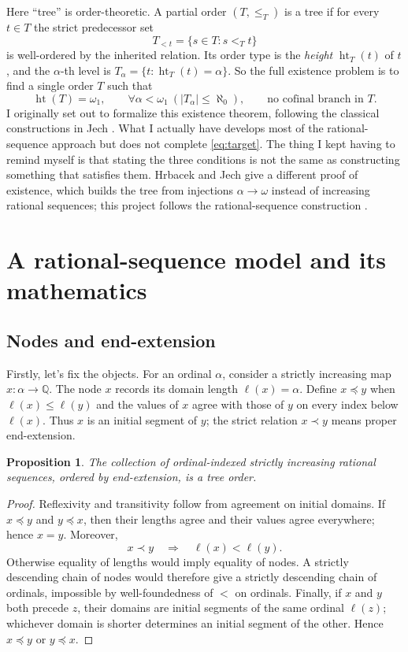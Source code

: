 \documentclass[10pt,letterpaper]{article}
\newtheorem{proposition}{Proposition}
\newcommand{\wone}{\omega_1}
\newcommand{\Q}{\mathbb{Q}}
\begin{document}
Here ``tree'' is order-theoretic. A partial order $(T,\leq_T)$ is a tree if for every $t\in T$ the strict predecessor set
\[
T_{<t}=\{s\in T:s<_Tt\}
\]
is well-ordered by the inherited relation. Its order type is the \emph{height} $\operatorname{ht}_T(t)$ of $t$, and the $\alpha$-th level is $T_\alpha=\{t:\operatorname{ht}_T(t)=\alpha\}$. So the full existence problem is to find a single order $T$ such that
\begin{equation}\label{eq:target}
\operatorname{ht}(T)=\wone,\qquad
\forall\alpha<\wone\ (|T_\alpha|\leq\aleph_0),\qquad
\text{no cofinal branch in }T.
\end{equation}
I originally set out to formalize this existence theorem, following the classical constructions in Jech \cite{jech}. What I actually have develops most of the rational-sequence approach but does not complete \eqref{eq:target}. The thing I kept having to remind myself is that stating the three conditions is not the same as constructing something that satisfies them. Hrbacek and Jech \cite[Ch.~12, Thm.~3.5]{hj} give a different proof of existence, which builds the tree from injections $\alpha\to\omega$ instead of increasing rational sequences; this project follows the rational-sequence construction \cite[Theorem 9.16]{jech}.


\section{A rational-sequence model and its mathematics}
\subsection{Nodes and end-extension}
Firstly, let's fix the objects. For an ordinal $\alpha$, consider a strictly increasing map $x:\alpha\to\Q$. The node $x$ records its domain length $\ell(x)=\alpha$. Define $x\preceq y$ when $\ell(x)\leq\ell(y)$ and the values of $x$ agree with those of $y$ on every index below $\ell(x)$. Thus $x$ is an initial segment of $y$; the strict relation $x\prec y$ means proper end-extension.

\begin{proposition}\label{prop:tree}
The collection of ordinal-indexed strictly increasing rational sequences, ordered by end-extension, is a tree order.
\end{proposition}
\begin{proof}
Reflexivity and transitivity follow from agreement on initial domains. If $x\preceq y$ and $y\preceq x$, then their lengths agree and their values agree everywhere; hence $x=y$. Moreover,
\[
x\prec y \quad\Longrightarrow\quad \ell(x)<\ell(y).
\]
Otherwise equality of lengths would imply equality of nodes. A strictly descending chain of nodes would therefore give a strictly descending chain of ordinals, impossible by well-foundedness of $<$ on ordinals. Finally, if $x$ and $y$ both precede $z$, their domains are initial segments of the same ordinal $\ell(z)$; whichever domain is shorter determines an initial segment of the other. Hence $x\preceq y$ or $y\preceq x$.
\end{proof}
\end{document}
